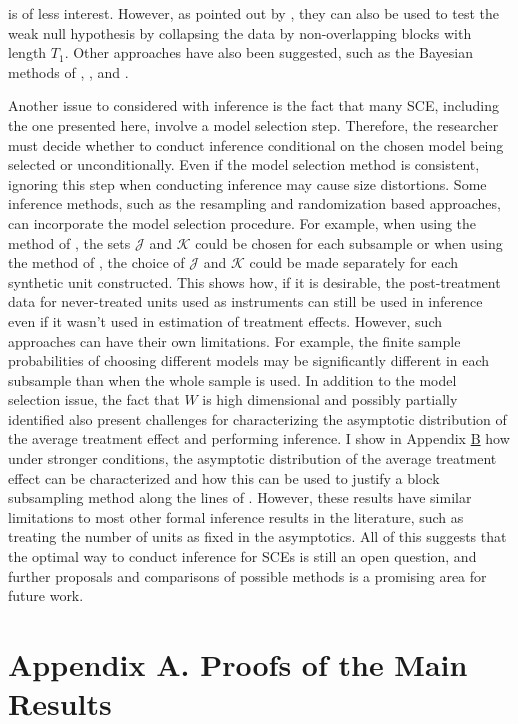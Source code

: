 \documentclass{article}
\begin{document}
is of less interest. However, as pointed out by \cite{ConformalInference}, they can also be used to test the weak null hypothesis by collapsing the data by non-overlapping blocks with length $T_1$. Other approaches have also been suggested, such as the Bayesian methods of \cite{amjad2017robust}, \cite{KimEtAl2020}, and \cite{Tuomaala2019TheBS}. 
\par 
Another issue to considered with inference is the fact that many SCE, including the one presented here, involve a model selection step. Therefore, the researcher must decide whether to conduct inference conditional on the chosen model being selected or unconditionally. Even if the model selection method is consistent, ignoring this step when conducting inference may cause size distortions. Some inference methods, such as the resampling and randomization based approaches, can incorporate the model selection procedure. For example, when using the method of \cite{Li2020}, the sets $\mathcal{J}$ and $\mathcal{K}$ could be chosen for each subsample or when using the method of \cite{Abadie2010}, the choice of $\mathcal{J}$ and $\mathcal{K}$ could be made separately for each synthetic unit constructed. This shows how, if it is desirable, the post-treatment data for never-treated units used as instruments can still be used in inference even if it wasn't used in estimation of treatment effects. However, such approaches can have their own limitations. For example, the finite sample probabilities of choosing different models may be significantly different in each subsample than when the whole sample is used. In addition to the model selection issue, the fact that $W$ is high dimensional and possibly partially identified also present challenges for characterizing the asymptotic distribution of the average treatment effect and performing inference. I show in Appendix \hyperref[ApB]{B} how under stronger conditions, the asymptotic distribution of the average treatment effect can be characterized and how this can be used to justify a block subsampling method along the lines of \cite{Li2020}. However, these results have similar limitations to most other formal inference results in the literature, such as treating the number of units as fixed in the asymptotics. All of this suggests that the optimal way to conduct inference for SCEs is still an open question, and further proposals and comparisons of possible methods is a promising area for future work.



\section*{Appendix A. Proofs of the Main Results}\label{ApA}
\end{document}
